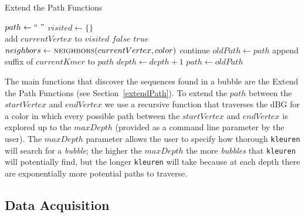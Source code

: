 \documentclass[hidelinks, 10pt, conference, compsocconf]{IEEEtran}
\begin{document}
\begin{algorithm}
\caption{Extend the Path Functions}\label{extendPathAlg}
\begin{algorithmic}[1]
    	\State $path \gets ``~"$
        \State $visited \gets \{\}$ 
        	\State {}
        \EndIf
    \EndFunction
    \\
    	\State add $currentVertex$ to $visited$
        	\State \Return $false$
        \EndIf
        	\State \Return $true$
        \EndIf
        \State $neighbors \gets \Call{neighbors}{currentVertex, color}$
            	\State continue
            \EndIf
            \State $oldPath \gets path$ 
            \State append suffix of $currentKmer$ to $path$
            \State $depth \gets depth + 1$
            	\State $path \gets oldPath$
            \Else
            	\State {}
            \EndIf
        \EndFor
    \EndFunction
\end{algorithmic}
\end{algorithm}

The main functions that discover the sequences found in a bubble are the Extend the Path Functions (see Section~\ref{extendPath}).
To extend the $path$ between the $startVertex$ and $endVertex$ we use a recursive function that traverses the dBG for a color in which every possible path between the $startVertex$ and $endVertex$ is explored up to the $maxDepth$ (provided as a command line parameter by the user).
The $maxDepth$ parameter allows the user to specify how thorough \texttt{kleuren} will search for a \textit{bubble}; the higher the $maxDepth$ the more \textit{bubbles} that \texttt{kleuren} will potentially find, but the longer \texttt{kleuren} will take because at each depth there are exponentially more potential paths to traverse.

\subsection{Data Acquisition}
\end{document}

